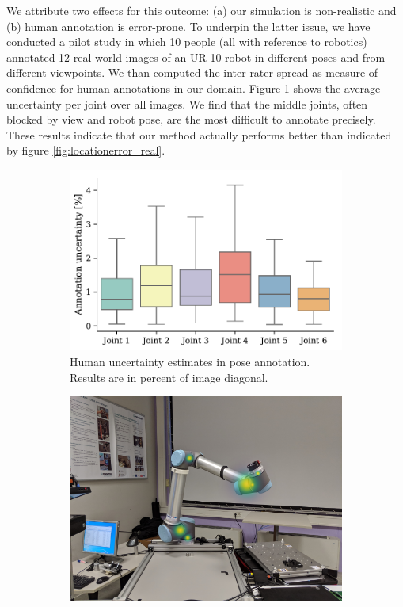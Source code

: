 \documentclass[conference]{IEEEtran}
\begin{document}
    We attribute two effects for this outcome: (a) our simulation is non-realistic and (b) human annotation is error-prone. To underpin the latter issue, we have conducted a pilot study in which 10 people (all with reference to robotics) annotated 12 real world images of an UR-10 robot in different poses and from different viewpoints. We than computed the inter-rater spread as measure of confidence for human annotations in our domain. Figure \ref{fig:humanuncertainty} shows the average uncertainty per joint over all images. We find that the middle joints, often blocked by view and robot pose, are the most difficult to annotate precisely. These results indicate that our method actually performs better than indicated by figure \ref{fig:locationerror_real}. 

    \begin{figure}[!h]
        \centering
        \begin{subfigure}[t]{0.49\columnwidth}
            \includegraphics[width=\columnwidth]{figures/results/human_uncertainty/human_uncertainty.pdf}
            \caption {
                \label{fig:humanuncertainty} 
                Human uncertainty estimates in pose annotation. Results are in percent of image diagonal.
            }
        \end{subfigure}
        \begin{subfigure}[t]{0.49\columnwidth}
            \includegraphics[width=\columnwidth]{figures/results/human_uncertainty/human_uncertainty_belief.png}

\end{subfigure}
\end{figure}
\end{document}
